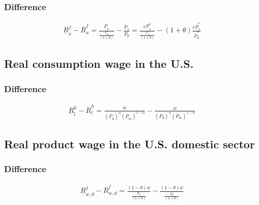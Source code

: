 \subsubsection*{Difference}
\begin{equation}\label{xpro.diff}
\begin{aligned}
\underline R^f_x - \overline R^f_x = \frac{\underline P_x}{\frac{\underline P_d}{ \left( 1+\theta \right) }} - \frac{\overline P_x}{\overline P_d} = \frac{\underline e \underline P^*_x}{\frac{\underline P_d}{ \left( 1+\theta \right) }} -  \left( 1+\theta \right) \frac{\overline e \overline P^*_x}{\overline P^*_d}
\end{aligned} 
\end{equation}


\subsection*{Real consumption wage in the U.S.}


\subsubsection*{Difference}
\begin{equation}\label{conw.diff}
\begin{aligned}
\underline R^{h}_l - \overline R^{h}_l = \frac{\underline w}{ \left( \underline P_{d} \right) ^{\alpha}  \left( \underline P_m \right) ^{1-\alpha}} - \frac{\overline w}{ \left( \overline P_{d} \right) ^{\alpha}  \left( \overline P_m \right) ^{1-\alpha}}\end{aligned}  \end{equation}


\subsection*{Real product wage in the U.S. domestic sector}

\subsubsection*{Difference}
\begin{equation}\label{prodw.diff}
\begin{aligned}
\underline R^f_{w, d} - \overline R^f_{w, d} = \frac{ \left( 1-\theta \right) \underline w}{\frac{\underline P_d}{ \left( 1+\theta \right) }} - \frac{ \left( 1-\theta \right) \overline w}{\frac{\overline P_d}{ \left( 1+\theta \right) }} \end{aligned}  \end{equation}


